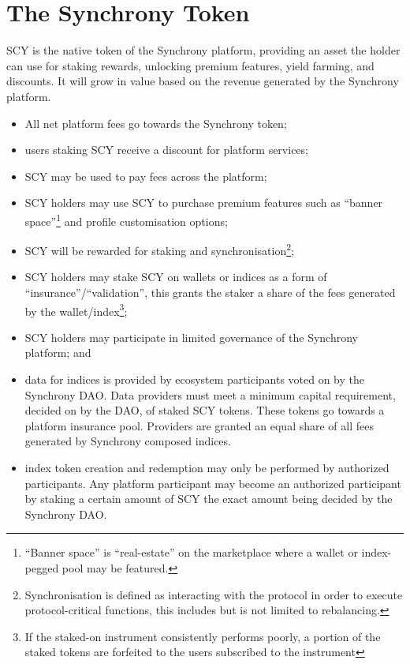 \documentclass[10pt]{article}
\begin{document}
					\section{The Synchrony Token}
					SCY is the native token of the Synchrony platform, providing an asset the holder
					can use for staking rewards, unlocking premium features, yield farming, and
					discounts. It will grow in value based on the revenue generated by the Synchrony
					platform.
					\begin{itemize}
						\item All net platform fees go towards the Synchrony token;
						\item users staking SCY receive a discount for platform services;
						\item SCY may be used to pay fees across the platform;
						\item SCY holders may use SCY to purchase premium features such as ``banner
							space''\footnote[8]{``Banner space'' is ``real-estate'' on the
							marketplace where a wallet or index-pegged pool may be featured.} and
							profile customisation options;
						\item SCY will be rewarded for staking and
							synchronisation\footnote[9]{Synchronisation is defined as interacting
							with the protocol in order to execute protocol-critical functions, this
							includes but is not limited to rebalancing.};
						\item SCY holders may stake SCY on wallets or indices as a form of
							``insurance''/``validation'', this grants the staker a share of the fees
							generated by the wallet/index\footnote[10]{If the staked-on instrument
							consistently performs poorly, a portion of the staked tokens are
							forfeited to the users subscribed to the instrument};
						\item SCY holders may participate in limited governance of the Synchrony
							platform; and
						\item data for indices is provided by ecosystem participants voted on by the
							Synchrony DAO. Data providers must meet a minimum capital requirement,
							decided on by the DAO, of staked SCY tokens. These tokens go towards
							a platform insurance pool. Providers are granted an equal share of all
							fees generated by Synchrony composed indices.
						\item index token creation and redemption may only be performed by
							authorized participants. Any platform participant may become an authorized participant by
							staking a certain amount of SCY the exact amount being decided by the
							Synchrony DAO.
					\end{itemize}
\end{document}
